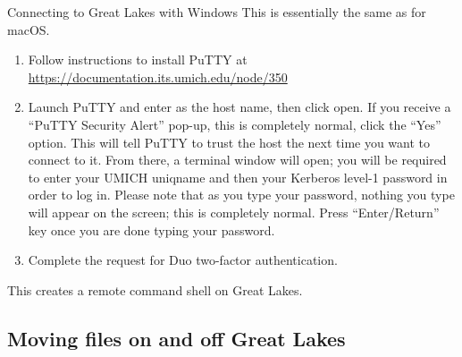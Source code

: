 \begin{frame}{Connecting to Great Lakes with Windows}
This is essentially the same as for macOS.
  \begin{enumerate}
  \item Follow instructions to install PuTTY at \url{https://documentation.its.umich.edu/node/350}
  \item Launch PuTTY and enter  as the host name, then click open.
If you receive a ``PuTTY Security Alert'' pop-up, this is completely normal, click the ``Yes'' option. This will tell PuTTY to trust the host the next time you want to connect to it. From there, a terminal window will open; you will be required to enter your UMICH uniqname and then your Kerberos level-1 password in order to log in. Please note that as you type your password, nothing you type will appear on the screen; this is completely normal. Press ``Enter/Return'' key once you are done typing your password.
\item Complete the request for Duo two-factor authentication.
  \end{enumerate}
This creates a remote command shell on Great Lakes.

\end{frame}


\subsection{Moving files on and off Great Lakes}

